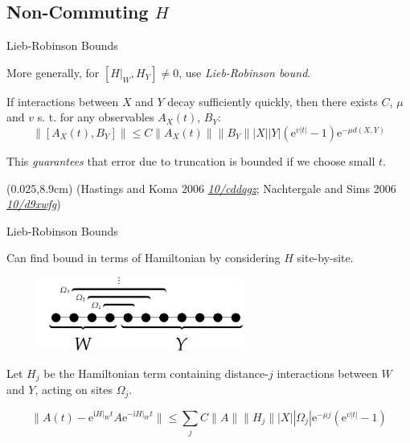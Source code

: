 \documentclass[xcolor=dvipsnames, compress]{beamer}
\renewcommand\UrlFont{\color{red}\rmfamily\itshape}
\newcommand{\shortdoi}[1]{\href{http://doi.org/#1}{\UrlFont 10/#1}}
\newcommand{\ee}{\mathrm{e}}
\newcommand{\ii}{\mathrm{i}}
\newcommand{\bottomnote}[1]{
  \begin{textblock*}{0.95\paperwidth} (0.025\paperwidth,8.9cm)
    {\tiny \hfill #1}
  \end{textblock*}
}
\begin{document}
\subsection{Non-Commuting $H$}

\begin{frame}{Lieb-Robinson Bounds}

  More generally, for $[H|_W, H_Y] \ne 0$, use \emph{Lieb-Robinson bound}.

  If interactions between $X$ and $Y$ decay sufficiently quickly,
  then there exists $C$, $\mu$ and $v$ s. t. for any observables $A_X(t)$, $B_Y$:
  $$
    \|[A_X(t), B_Y]\| \le C \|A_X(t)\| \|B_Y\| |X| |Y| (\ee^{v|t|} - 1) \ee^{-\mu d(X, Y)}
  $$

  This \emph{guarantees} that error due to truncation is bounded if
  we choose small $t$.

  \bottomnote{(Hastings and Koma 2006 \shortdoi{cddqgz}; Nachtergale and Sims 2006 \shortdoi{d9xwfg})}

\end{frame}

\begin{frame}{Lieb-Robinson Bounds}

  Can find bound in terms of Hamiltonian by considering $H$ site-by-site.

  \begin{figure}
    \centering
    \includegraphics[width=0.6\textwidth]{figures/bootstrapping-partition-distance}
  \end{figure}

  Let $H_j$ be the Hamiltonian term containing distance-$j$
  interactions between $W$ and $Y$, acting on sites $\Omega_j$.

  $$
    \|A(t) - \ee^{\ii H|_W t} A \ee^{-\ii H|_W t} \| \le
    \sum_{j} C \|A\| \|H_j\| |X| |\Omega_j| \ee^{-\mu j} (\ee^{v |t|} - 1)
  $$

\end{frame}
\end{document}
